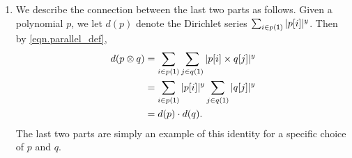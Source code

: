 \documentclass[Book-Poly]{subfiles}
\begin{document}
\begin{exercise}
\begin{solution}
\begin{enumerate}
      \item We describe the connection between the last two parts as follows.
      Given a polynomial $p$, we let $d(p)$ denote the Dirichlet series $\sum_{i \in p(\textsf{1})} |p[i]|^y$.
      Then by \eqref{eqn.parallel_def},
      \begin{align*}
        d(p \otimes q) &= \sum_{i \in p(\textsf{1})} \sum_{j \in q(\textsf{1})} |p[i] \times q[j]|^y \\
        &= \sum_{i \in p(\textsf{1})} |p[i]|^y \sum_{j \in q(\textsf{1})} |q[j]|^y \\
        &= d(p) \cdot d(q).
      \end{align*}
      The last two parts are simply an example of this identity for a specific choice of $p$ and $q$.
    \end{enumerate}
  \end{solution}
\end{exercise}
\end{document}
